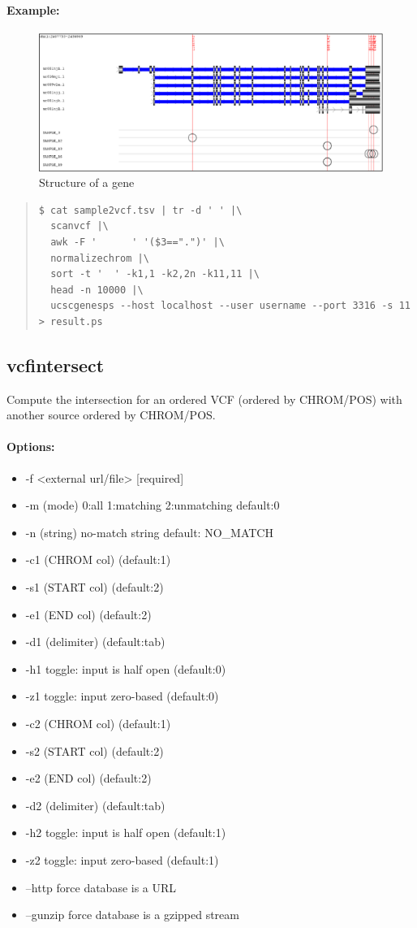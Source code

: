 \documentclass[12pt]{article}
\begin{document}
\paragraph{Example:}
\begin{figure}
\includegraphics[keepaspectratio=true,scale=0.45]{ucscgenes.eps}
\caption{Structure of a gene}
\end{figure}
\begin{quote}
\begin{verbatim}
$ cat sample2vcf.tsv | tr -d ' ' |\
  scanvcf |\
  awk -F '      ' '($3==".")' |\
  normalizechrom |\
  sort -t '  ' -k1,1 -k2,2n -k11,11 |\
  head -n 10000 |\
  ucscgenesps --host localhost --user username --port 3316 -s 11 > result.ps 
\end{verbatim}
\end{quote}


\subsection{vcfintersect}
Compute the intersection for an ordered VCF (ordered by CHROM/POS) with another source ordered by CHROM/POS.
\paragraph{Options:}
\begin{itemize}
\item-f <external url/file> [required]
\item-m (mode) 0:all 1:matching 2:unmatching default:0
\item-n (string) no-match string default: NO\_MATCH
\item-c1 (CHROM col) (default:1)
\item-s1 (START col) (default:2)
\item-e1 (END col) (default:2)
\item-d1 (delimiter) (default:tab)
\item-h1  toggle: input is half open (default:0)
\item-z1  toggle: input zero-based (default:0)
\item-c2 (CHROM col) (default:1)
\item-s2 (START col) (default:2)
\item-e2 (END col) (default:2)
\item-d2 (delimiter) (default:tab)
\item-h2  toggle: input is half open (default:1)
\item-z2  toggle: input zero-based (default:1)
\item--http  force database is a URL 
\item--gunzip  force database is a gzipped stream 
\end{itemize}
\end{document}
